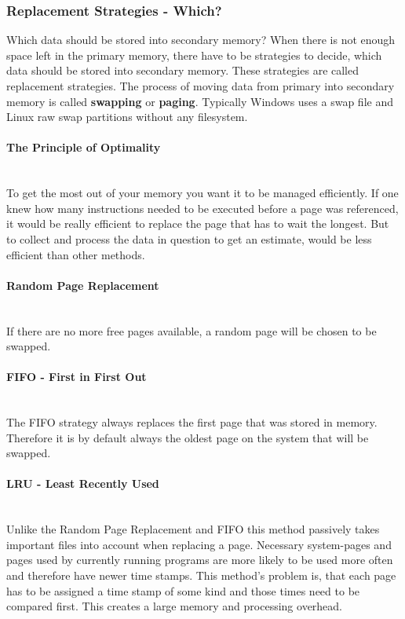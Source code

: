 \subsubsection{Replacement Strategies - Which?}
Which data should be stored into secondary memory? When there is not enough space left in the primary memory, there have to be strategies to decide, which data should be stored into secondary memory. These strategies are called replacement strategies. The process of moving data from primary into secondary memory is called \textbf{swapping} or \textbf{paging}. Typically Windows uses a swap file and Linux raw swap partitions without any filesystem.

\paragraph{The Principle of Optimality}~\\
To get the most out of your memory you want it to be managed efficiently. If one knew how many instructions needed to be executed before a page was referenced, it would be really efficient to replace the page that has to wait the longest. But to collect and process the data in question to get an estimate, would be less efficient than other methods.

\paragraph{Random Page Replacement}~\\
If there are no more free pages available, a random page will be chosen to be swapped.

\paragraph{FIFO - First in First Out}~\\
The FIFO strategy always replaces the first page that was stored in memory. Therefore it is by default always the oldest page on the system that will be swapped.

\paragraph{LRU - Least Recently Used}~\\
Unlike the Random Page Replacement and FIFO this method passively takes important files into account when replacing a page. Necessary system-pages and pages used by currently running programs are more likely 
to be used more often and therefore have newer time stamps. This method's problem is, that each page has to be assigned a time stamp of some kind and those times need to be compared first. This creates a large memory and processing overhead.

